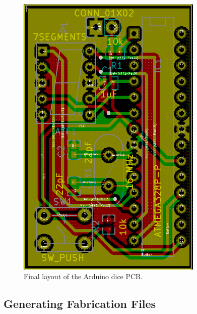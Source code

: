 \documentclass[12pt,letterpaper]{scrartcl}
\begin{document}
\begin{enumerate}
	\begin{figure}[hp]
		\centering
		\includegraphics[width=3.5in]{layout-final}
		\caption{Final layout of the Arduino dice PCB.}
		\label{fig:layout-final}
	\end{figure}
\end{enumerate}

\subsection{Generating Fabrication Files}
\label{sec:gerber}
\end{document}
